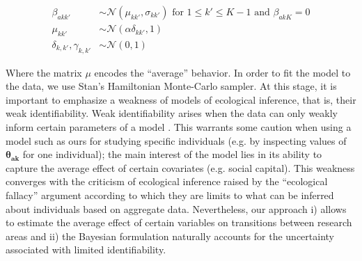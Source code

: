 \documentclass{article}
\begin{document}
\begin{align}
    \beta_{akk'} &\sim \mathcal{N}(\mu_{k k'},\sigma_{k k'}) \text{ for } 1\leq k' \leq K-1 \text{ and } \beta_{ak K} = 0\\
    \mu_{k k'} &\sim \mathcal{N}(\alpha \delta_{kk'},1)\\
    \delta_{k,k'},\gamma_{k,k'} &\sim \mathcal{N}(0,1) 
\end{align}

Where the matrix $\mu$ encodes the ``average'' behavior. In order to fit the model to the data, we use Stan's Hamiltonian Monte-Carlo sampler. At this stage, it is important to emphasize a weakness of models of ecological inference, that is, their weak identifiability. Weak identifiability arises when the data can only weakly inform certain parameters of a model \citep{Gimenez2009}. This warrants some caution when using a model such as ours for studying specific individuals (e.g. by inspecting values of $\bm{\theta_{ak}}$ for one individual); the main interest of the model lies in its ability to capture the average effect of certain covariates (e.g. social capital). This weakness converges with the criticism of ecological inference raised by the ``ecological fallacy'' argument \citep{freedman1999ecological} according to which they are limits to what can be inferred about individuals based on aggregate data. Nevertheless, our approach i) allows to estimate the average effect of certain variables on transitions between research areas and ii) the Bayesian formulation naturally accounts for the uncertainty associated with limited identifiability.


\end{document}
